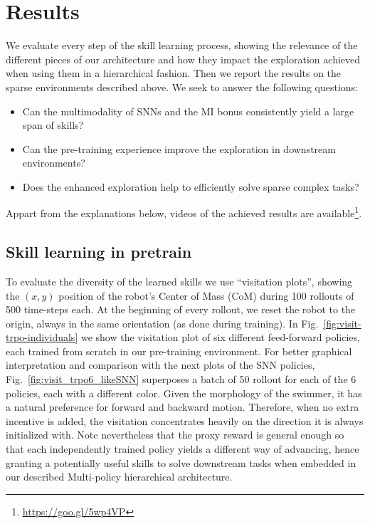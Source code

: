 \documentclass{article} %
\begin{document}
\section{Results}
\label{sec:results}
We evaluate every step of the skill learning process, showing the relevance of the different pieces of our architecture and how they impact the exploration achieved when using them in a hierarchical fashion. Then we report the results on the sparse environments described above. We seek to answer the following questions:
\begin{itemize}
\vspace{-8pt}
    \setlength\itemsep{0em}
    \item Can the multimodality of SNNs and the MI bonus consistently yield a large span of skills? 
    \item Can the pre-training experience improve the exploration in downstream environments?
    \item Does the enhanced exploration help to efficiently solve sparse complex tasks?
\end{itemize}
Appart from the explanations below, videos of the achieved results are available\footnote{\label{foot:video} \url{https://goo.gl/5wp4VP}}. 

\subsection{Skill learning in pretrain}

To evaluate the diversity of the learned skills we use ``visitation plots'', showing the $(x,y)$ position of the robot's Center of Mass (CoM) during 100 rollouts of 500 time-steps each. At the beginning of every rollout, we reset the robot to the origin, always in the same orientation (as done during training). In Fig.\ \ref{fig:visit-trpo-individuals} we show the visitation plot of six different feed-forward policies, each trained from scratch in our pre-training environment. For better graphical interpretation and comparison with the next plots of the SNN policies, Fig.\ \ref{fig:visit_trpo6_likeSNN} superposes a batch of 50 rollout for each of the 6 policies, each with a different color. Given the morphology of the swimmer, it has a natural preference for forward and backward motion. Therefore, when no extra incentive is added, the visitation concentrates heavily on the direction it is always initialized with. Note nevertheless that the proxy reward is general enough so that each independently trained policy yields a different way
of advancing, hence granting a potentially useful skills to solve downstream tasks when embedded in our described Multi-policy hierarchical architecture.
\end{document}
